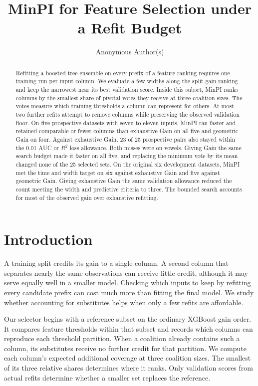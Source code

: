 \documentclass{article}
\title{MinPI for Feature Selection under a Refit Budget}
\author{Anonymous Author(s)}
\begin{document}
\maketitle
\begin{abstract}
Refitting a boosted tree ensemble on every prefix of a feature ranking requires one training run per input column. We evaluate a few widths along the split-gain ranking and keep the narrowest near its best validation score. Inside this subset, MinPI ranks columns by the smallest share of pivotal votes they receive at three coalition sizes. The votes measure which training thresholds a column can represent for others. At most two further refits attempt to remove columns while preserving the observed validation floor. On five prospective datasets with seven to eleven inputs, MinPI ran faster and retained comparable or fewer columns than exhaustive Gain on all five and geometric Gain on four. Against exhaustive Gain, 23 of 25 prospective pairs also stayed within the 0.01 AUC or $R^2$ loss allowance. Both misses were on vowels. Giving Gain the same search budget made it faster on all five, and replacing the minimum vote by its mean changed none of the 25 selected sets. On the original six development datasets, MinPI met the time and width target on six against exhaustive Gain and five against geometric Gain. Giving exhaustive Gain the same validation allowance reduced the count meeting the width and predictive criteria to three. The bounded search accounts for most of the observed gain over exhaustive refitting.
\end{abstract}

\section{Introduction}
A training split credits its gain to a single column. A second column that separates nearly the same observations can receive little credit, although it may serve equally well in a smaller model. Checking which inputs to keep by refitting every candidate prefix can cost much more than fitting the final model. We study whether accounting for substitutes helps when only a few refits are affordable.

Our selector begins with a reference subset on the ordinary XGBoost gain order. It compares feature thresholds within that subset and records which columns can reproduce each threshold partition. When a coalition already contains such a column, its substitutes receive no further credit for that partition. We compute each column's expected additional coverage at three coalition sizes. The smallest of its three relative shares determines where it ranks. Only validation scores from actual refits determine whether a smaller set replaces the reference.
\end{document}
